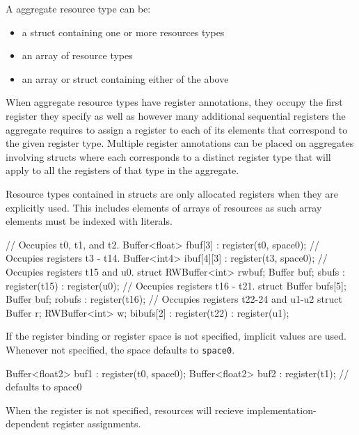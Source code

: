 A aggregate resource type can be:
\begin{itemize}
\item a struct containing one or more resources types
\item an array of resource types
\item an array or struct containing either of the above
\end{itemize}

When aggregate resource types have register annotations,
they occupy the first register they specify as well as however many additional sequential registers
the aggregate requires to assign a register to each of its elements that correspond to the given register type.
Multiple register annotations can be placed on aggregates involving structs where each corresponds to a distinct
register type that will apply to all the registers of that type in the aggregate.

\begin{note}
Resource types contained in structs are only allocated registers when they are explicitly used.
This includes elements of arrays of resources as such array elements must be indexed with literals.
\end{note}

\begin{HLSL}
  // Occupies t0, t1, and t2.
  Buffer<float> fbuf[3] : register(t0, space0);
  // Occupies registers t3 - t14.
  Buffer<int4> ibuf[4][3] : register(t3, space0);
  // Occupies registers t15 and u0.
  struct {RWBuffer<int> rwbuf; Buffer buf;} sbufs : register(t15) : register(u0);
  // Occupies registers t16 - t21.
  struct {Buffer bufs[5]; Buffer buf;} robufs : register(t16);
  // Occupies registers t22-24 and u1-u2
  struct {Buffer r; RWBuffer<int> w;} bibufs[2] : register(t22) : register(u1);
\end{HLSL}

If the register binding or register space is not specified, implicit values are used.
Whenever not specified, the space defaults to \texttt{space0}.

\begin{HLSL}
  Buffer<float2> buf1 : register(t0, space0);
  Buffer<float2> buf2 : register(t1); // defaults to space0
\end{HLSL}

When the register is not specified, resources will recieve implementation-dependent register assignments.
